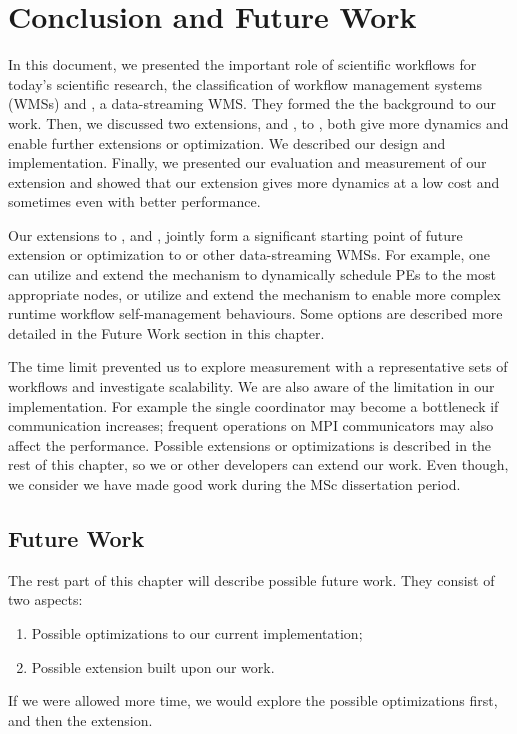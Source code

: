 \chapter{Conclusion and Future Work}
In this document, we presented the important role of scientific workflows for today's scientific research, the classification of workflow management systems (WMSs) and \dpy, a data-streaming WMS. They formed the the background to our work. Then, we discussed two extensions, \tincdep and \tdynexp, to \dpy, both give \dpy more dynamics and enable further extensions or optimization. We described our design and implementation. Finally, we presented our evaluation and measurement of our extension and showed that our extension gives \dpy more dynamics at a low cost and sometimes even with better performance.

Our extensions to \dpy, \tincdep and \tdynexp, jointly form a significant starting point of future extension or optimization to \dpy or other data-streaming WMSs. For example, one can utilize and extend the \tincdep mechanism to dynamically schedule PEs to the most appropriate nodes, or utilize and extend the \tdynexp mechanism to enable more complex runtime workflow self-management behaviours. Some options are described more detailed in the Future Work section in this chapter.

The time limit prevented us to explore measurement with a representative sets of workflows and investigate scalability. We are also aware of the limitation in our implementation. For example the single coordinator may become a bottleneck if communication increases; frequent operations on MPI communicators may also affect the performance. Possible extensions or optimizations is described in the rest of this chapter, so we or other developers can extend our work. Even though, we consider we have made good work during the MSc dissertation period.

\section{Future Work}
The rest part of this chapter will describe possible future work. They consist of two aspects:
\begin{enumerate}
	\item Possible optimizations to our current implementation;
	\item Possible extension built upon our work.
\end{enumerate}

If we were allowed more time, we would explore the possible optimizations first, and then the extension.

